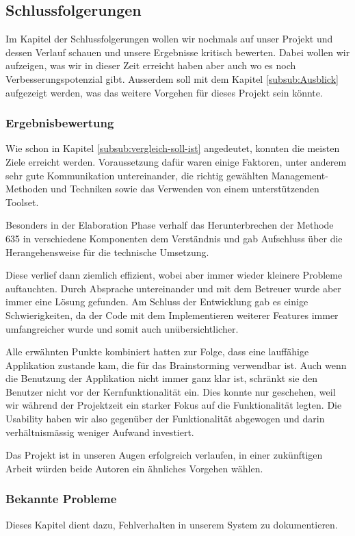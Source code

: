 \subsection{Schlussfolgerungen}
Im Kapitel der Schlussfolgerungen wollen wir nochmals auf unser Projekt und dessen Verlauf schauen und unsere Ergebnisse kritisch bewerten. Dabei wollen wir aufzeigen, was wir in dieser Zeit erreicht haben aber auch wo es noch Verbesserungspotenzial gibt. Ausserdem soll mit dem Kapitel \ref{subsub:Ausblick} aufgezeigt werden, was das weitere Vorgehen für dieses Projekt sein könnte.

\subsubsection{Ergebnisbewertung}
Wie schon in Kapitel \ref{subsub:vergleich-soll-ist} angedeutet, konnten die meisten Ziele erreicht werden. Voraussetzung dafür waren einige Faktoren, unter anderem sehr gute Kommunikation untereinander, die richtig gewählten Management-Methoden und Techniken sowie das Verwenden von einem unterstützenden Toolset. 

Besonders in der Elaboration Phase verhalf das Herunterbrechen der Methode 635 in verschiedene Komponenten dem Verständnis und gab Aufschluss über die Herangehensweise für die technische Umsetzung. 

Diese verlief dann ziemlich effizient, wobei aber immer wieder kleinere Probleme auftauchten. Durch Absprache untereinander und mit dem Betreuer wurde aber immer eine Lösung gefunden. Am Schluss der Entwicklung gab es einige Schwierigkeiten, da der Code mit dem Implementieren weiterer Features immer umfangreicher wurde und somit auch unübersichtlicher. 

Alle erwähnten Punkte kombiniert hatten zur Folge, dass eine lauffähige Applikation zustande kam, die für das Brainstorming verwendbar ist. Auch wenn die Benutzung der Applikation nicht immer ganz klar ist, schränkt sie den Benutzer nicht vor der Kernfunktionalität ein. Dies konnte nur geschehen, weil wir während der Projektzeit ein starker Fokus auf die Funktionalität legten. Die Usability haben wir also gegenüber der Funktionalität abgewogen und darin verhältnismässig weniger Aufwand investiert. 

Das Projekt ist in unseren Augen erfolgreich verlaufen, in einer zukünftigen Arbeit würden beide Autoren ein ähnliches Vorgehen wählen. 

\subsubsection{Bekannte Probleme}
Dieses Kapitel dient dazu, Fehlverhalten in unserem System zu dokumentieren.

